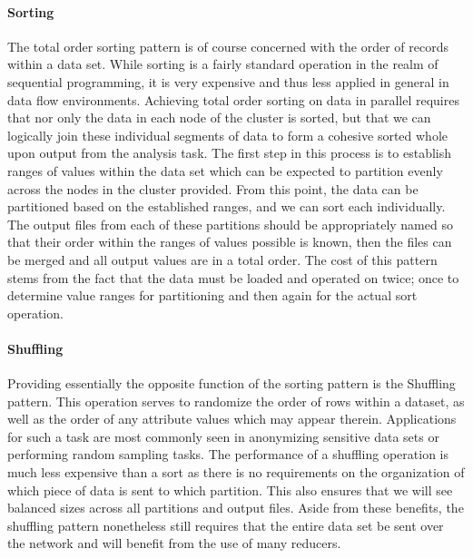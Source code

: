 \paragraph{Sorting}
The total order sorting pattern is of course concerned with the order of records within a data set. While sorting is a fairly standard operation in the realm of sequential programming, it is  very expensive and thus less applied in general in data flow environments. Achieving total order sorting on data in parallel requires that nor only the data in each node of the cluster is sorted, but that we can logically join these individual segments of data to form a cohesive sorted whole upon output from the analysis task. The first step in this process is to establish ranges of values within the data set which can be expected to partition evenly across the nodes in the cluster provided. From this point, the data can be partitioned based on the established ranges, and we can sort each individually. The output files from each of these partitions should be appropriately named so that their order within the ranges of values possible is known, then the files can be merged and all output values are in a total order. The cost of this pattern stems from the fact that the data must be loaded and operated on twice; once to determine value ranges for partitioning and then again for the actual sort operation. 

\paragraph{Shuffling}
Providing essentially the opposite function of the sorting pattern is the Shuffling pattern. This operation serves to randomize the order of rows within a dataset, as well as the order of any attribute values which may appear therein. Applications for such a task are most commonly seen in anonymizing sensitive data sets or performing random sampling tasks. The performance of a shuffling operation is much less expensive than a sort as there is no requirements on the organization of which piece of data is sent to which partition. This also ensures that we will see balanced sizes across all partitions and output files. Aside from these benefits, the shuffling pattern nonetheless still requires that the entire data set be sent over the network and will benefit from the  use of many reducers.

